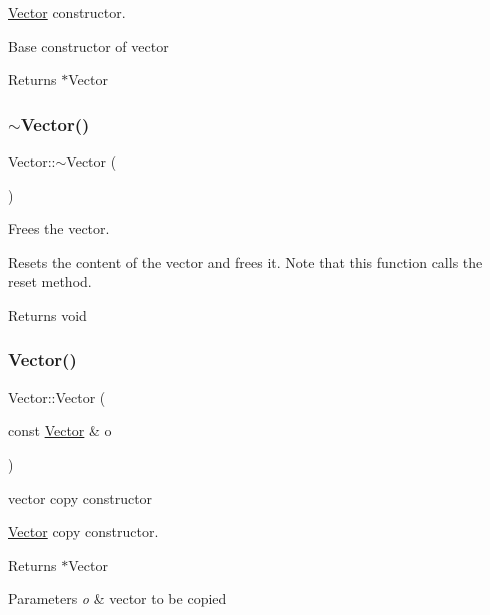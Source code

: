 \hyperlink{class_vector}{Vector} constructor. 

Base constructor of vector

\begin{DoxyReturn}{Returns}
$\ast$\+Vector 
\end{DoxyReturn}
\mbox{\label{class_vector_a2eb3c49587a4f12cade7895ccb73f6a0}} 
\subsubsection{\texorpdfstring{$\sim$\+Vector()}{~Vector()}}
{\footnotesize\ttfamily Vector\+::$\sim$\+Vector (\begin{DoxyParamCaption}{ }\end{DoxyParamCaption})}



Frees the vector. 

Resets the content of the vector and frees it. Note that this function calls the reset method.

\begin{DoxyReturn}{Returns}
void 
\end{DoxyReturn}
\mbox{\label{class_vector_a1a09f0b714eb24c7484ee55aaf308c92}} 
\subsubsection{\texorpdfstring{Vector()}{Vector()}\hspace{0.1cm}{\footnotesize\ttfamily [2/2]}}
{\footnotesize\ttfamily Vector\+::\+Vector (\begin{DoxyParamCaption}\item[{const \hyperlink{class_vector}{Vector} \&}]{o }\end{DoxyParamCaption})}



vector copy constructor 

\hyperlink{class_vector}{Vector} copy constructor.

\begin{DoxyReturn}{Returns}
$\ast$\+Vector 
\end{DoxyReturn}

\begin{DoxyParams}{Parameters}
{\em o} & vector to be copied \\
\hline
\end{DoxyParams}


